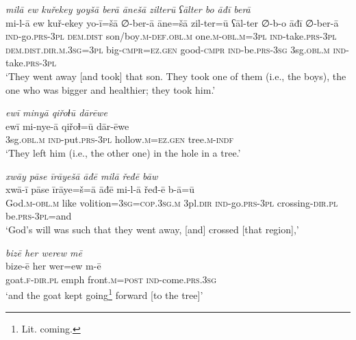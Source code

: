 \ea \label{ZB.40}
\textit{milā ew kuřekey yoyšā berā ānešā zilterū ʕālter bo āđī berā} \\ 
\gll mi-l-ā ew kuř-ekey yo-ī=šā ∅-ber-ā āne=šā zil-ter=ū ʕāl-ter ∅-b-o āđī ∅-ber-ā \\ 
 \textsc{ind-}go\textsc{.prs}\textsc{-3pl} \textsc{dem.dist} son/boy\textsc{.m}\textsc{-def}\textsc{.obl}\textsc{.m} one\textsc{.m}\textsc{-obl}\textsc{.m}\textsc{=3pl} \textsc{ind-}take\textsc{.prs}\textsc{-3pl} \textsc{dem.dist}\textsc{.dir}\textsc{.m}\textsc{.3sg}\textsc{=3pl} big\textsc{-cmpr}\textsc{\textsc{=ez.gen}} good\textsc{-cmpr} \textsc{ind-}be\textsc{.prs}\textsc{-3sg} 3sg\textsc{.obl}\textsc{.m} \textsc{ind-}take\textsc{.prs}\textsc{-3pl} \\ 
\glt `They went away [and took] that son. They took one of them (i.e., the boys), the one who was bigger and healthier; they took him.'
\z 
 
\ea \label{ZB.41}
\textit{ewī minyā qiřoɫū dārēwe} \\ 
\gll ewī mi-nye-ā qiřoɫ=ū dār-ēwe \\ 
 3sg\textsc{.obl}\textsc{.m} \textsc{ind-}put\textsc{.prs}\textsc{-3pl} hollow\textsc{.m}\textsc{\textsc{=ez.gen}} tree\textsc{.m}\textsc{-indf} \\ 
\glt `They left him (i.e., the other one) in the hole in a tree.'
\z 
 
\ea \label{ZB.43}
\textit{xwāy pāse īrāyešā āđē milā řeđē bāw} \\ 
\gll xwā-ī pāse īrāye=š=ā āđē mi-l-ā řeđ-ē b-ā=ū \\ 
 God\textsc{.m}\textsc{-obl}\textsc{.m} like volition\textsc{=3sg}\textsc{=cop}\textsc{.3sg}\textsc{.m} 3pl\textsc{.dir} \textsc{ind-}go\textsc{.prs}\textsc{-3pl} crossing\textsc{-dir}\textsc{.pl} be\textsc{.prs}\textsc{-3pl}=and \\ 
\glt `God’s will was such that they went away, [and] crossed [that region],'
\z 
 
\ea \label{ZB.44}
\textit{bizē her werew mē} \\ 
\gll bize-ē her wer=ew m-ē \\ 
 goat\textsc{.f}\textsc{-dir}\textsc{.pl} emph front\textsc{.m}\textsc{=\textsc{post}} \textsc{ind-}come\textsc{.prs}\textsc{.3sg} \\ 
\glt `and the goat kept going\footnote{Lit. coming.} forward [to the tree]'
\z 
 
